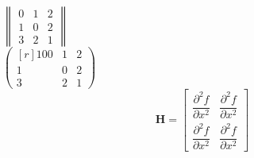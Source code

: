 \documentclass[]{article}
\begin{document}
	\centering $\begin{Vmatrix} 0 & 1 & 2 \\ 1 & 0 & 2 \\ 3 & 2 & 1\end{Vmatrix} 	$ \\
	
	\centering $\begin{pmatrix*}[r] 100 & 1 & 2 \\ 1 & 0 & 2 \\ 3 & 2 & 1\end{pmatrix*} 	$ \\
	
	\[
		\mathbf{H} = 
		\begin{bmatrix}
			\dfrac{\partial^2 f}{\partial x^2} & 
			\dfrac{\partial^2 f}{\partial x^2} \\
			\dfrac{\partial^2 f}{\partial x^2} &
			\dfrac{\partial^2 f}{\partial x^2}
		\end{bmatrix}
	\] \\
	
\end{document}
